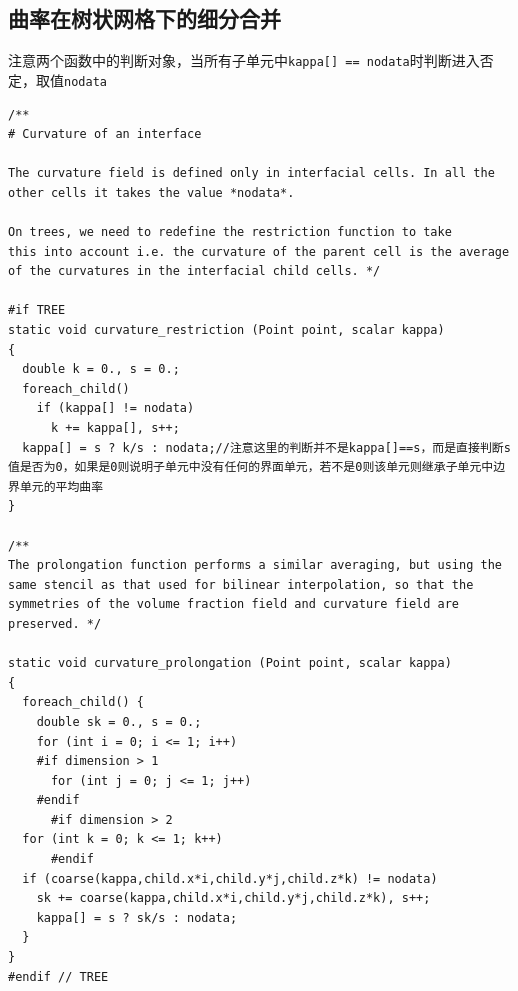 \documentclass[lang=cn,11pt,a4paper]{elegantpaper}
\begin{document}
\subsection{曲率在树状网格下的细分合并}
注意两个函数中的判断对象，当所有子单元中\texttt{kappa[] == nodata}时判断进入否定，取值\texttt{nodata} 
\begin{verbatim}
/**
# Curvature of an interface

The curvature field is defined only in interfacial cells. In all the
other cells it takes the value *nodata*. 

On trees, we need to redefine the restriction function to take
this into account i.e. the curvature of the parent cell is the average
of the curvatures in the interfacial child cells. */

#if TREE
static void curvature_restriction (Point point, scalar kappa)
{
  double k = 0., s = 0.;
  foreach_child()
    if (kappa[] != nodata)
      k += kappa[], s++;
  kappa[] = s ? k/s : nodata;//注意这里的判断并不是kappa[]==s，而是直接判断s值是否为0，如果是0则说明子单元中没有任何的界面单元，若不是0则该单元则继承子单元中边界单元的平均曲率
}

/**
The prolongation function performs a similar averaging, but using the
same stencil as that used for bilinear interpolation, so that the
symmetries of the volume fraction field and curvature field are
preserved. */

static void curvature_prolongation (Point point, scalar kappa)
{
  foreach_child() {
    double sk = 0., s = 0.;
    for (int i = 0; i <= 1; i++)
    #if dimension > 1
      for (int j = 0; j <= 1; j++)
    #endif
      #if dimension > 2
  for (int k = 0; k <= 1; k++)
      #endif
  if (coarse(kappa,child.x*i,child.y*j,child.z*k) != nodata)
    sk += coarse(kappa,child.x*i,child.y*j,child.z*k), s++;
    kappa[] = s ? sk/s : nodata;
  }
}
#endif // TREE
\end{verbatim}
\end{document}
